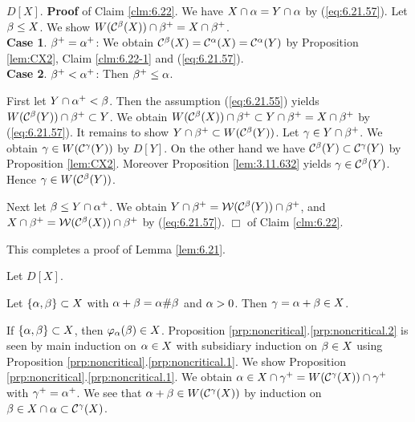 \documentclass{article}
\begin{document}
\bclm\label{clm:6.22}
$D[X]$.
\eclm
\textbf{Proof} of Claim \ref{clm:6.22}.
 We have $X\cap\alpha=Y\cap\alpha$ by (\ref{eq:6.21.57}).
Let $\beta\leq X$. 
We show $W(\mathcal{C}^{\beta}(X))\cap\beta^{+}=X\cap\beta^{+}$.
\\
\textbf{Case 1}. $\beta^{+}=\alpha^{+}$:
We obtain $\mathcal{C}^{\beta}(X)=\mathcal{C}^{\alpha}(X)=\mathcal{C}^{\alpha}(Y)$ by
Proposition \ref{lem:CX2}, Claim \ref{clm:6.22-1} and (\ref{eq:6.21.57}).
\\
\textbf{Case 2}. $\beta^{+}<\alpha^{+}$: Then $\beta^{+}\leq\alpha$.

First let $Y\cap\alpha^{+}<\beta$. Then the assumption (\ref{eq:6.21.55}) 
yields
$W(\mathcal{C}^{\beta}(Y))\cap\beta^{+}\subset Y$.
We obtain
$W(\mathcal{C}^{\beta}(X))\cap\beta^{+}\subset Y\cap\beta^{+}=X\cap\beta^{+}$
by (\ref{eq:6.21.57}).
It remains to show $Y\cap\beta^{+}\subset W(\mathcal{C}^{\beta}(Y))$.
Let $\gamma\in Y\cap\beta^{+}$.
We obtain $\gamma\in W(\mathcal{C}^{\gamma}(Y))$ by $D[Y]$.
On the other hand we have $\mathcal{C}^{\beta}(Y)\subset\mathcal{C}^{\gamma}(Y)$
by Proposition \ref{lem:CX2}.
Moreover Proposition \ref{lem:3.11.632} yields 
$\gamma\in \mathcal{C}^{\beta}(Y)$.
Hence $\gamma\in W(\mathcal{C}^{\beta}(Y))$.

Next let $\beta\leq Y\cap\alpha^{+}$.
We obtain $Y\cap\beta^{+}=\mathcal{W}(\mathcal{C}^{\beta}(Y))\cap\beta^{+}$, and
$X\cap\beta^{+}=\mathcal{W}(\mathcal{C}^{\beta}(X))\cap\beta^{+}$ by (\ref{eq:6.21.57}).
\hspace*{\fill} $\Box$ of Claim \ref{clm:6.22}.

This completes a proof of Lemma \ref{lem:6.21}.
\eprf




\bprp\label{prp:noncritical}
Let $D[X]$.
\benu
\item\label{prp:noncritical.1}
Let $\{\alpha,\beta\}\subset X$ with $\alpha+\beta=\alpha\#\beta$ and $\alpha>0$.
Then $\gamma=\alpha+\beta\in X$.

\item\label{prp:noncritical.2}
If $\{\alpha,\beta\}\subset X$, then $\varphi_{\alpha}(\beta)\in X$.
\eenu
\eprp
\bprf
Proposition \ref{prp:noncritical}.\ref{prp:noncritical.2} is seen 
by main induction on $\alpha\in X$ with
subsidiary induction on $\beta\in X$ using 
Proposition \ref{prp:noncritical}.\ref{prp:noncritical.1}.
We show Proposition \ref{prp:noncritical}.\ref{prp:noncritical.1}.
We obtain
$\alpha\in X\cap\gamma^{+}=W(\mathcal{C}^{\gamma}(X))\cap\gamma^{+}$ with 
$\gamma^{+}=\alpha^{+}$.
We see that $\alpha+\beta\in W(\mathcal{C}^{\gamma}(X))$ by induction on 
$\beta\in X\cap\alpha\subset \mathcal{C}^{\gamma}(X)$.
\eprf
\end{document}
